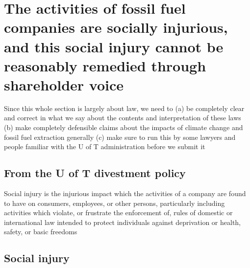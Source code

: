 


		\singlespacing
		\section{The activities of fossil fuel companies are socially injurious, and this social injury cannot be reasonably remedied through shareholder voice}
		\label{sec:SocialInjury}
		\doublespacing



\begin{vcom}		
Since this whole section is largely about law, we need to (a) be completely clear and correct in what we say about the contents and interpretation of these laws (b) make completely defensible claims about the impacts of climate change and fossil fuel extraction generally (c) make sure to run this by some lawyers and people familiar with the U of T administration before we submit it
\end{vcom}



	\subsection{From the U of T divestment policy}



\begin{itquote}
Social injury is the injurious impact which the activities of a company are found to have on consumers, employees, or other persons, particularly including activities which violate, or frustrate the enforcement of, rules of domestic or international law intended to protect individuals against deprivation or health, safety, or basic freedoms
\end{itquote}



	\subsection{Social injury}


